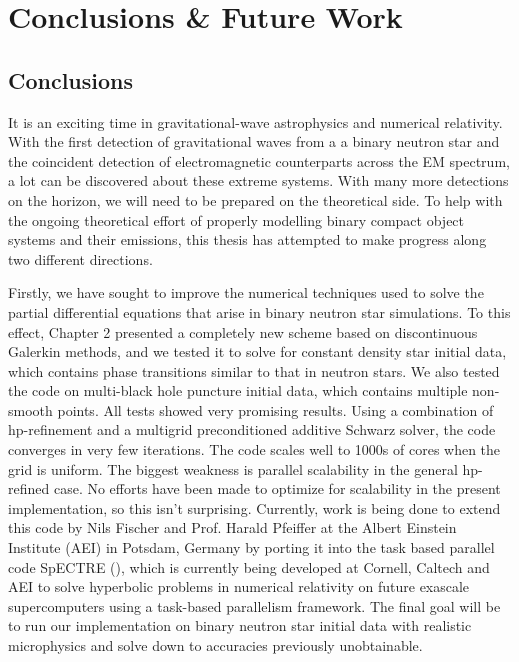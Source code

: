 \chapter{Conclusions \& Future Work}
\label{chap:conc}

\section{Conclusions}

It is an exciting time in gravitational-wave astrophysics and numerical relativity. With the first detection of gravitational waves from a a binary neutron star and the coincident detection of electromagnetic counterparts across the EM spectrum, a lot can be discovered about these extreme systems. With many more detections on the horizon, we will need to be prepared on the theoretical side. To help with the ongoing theoretical effort of properly modelling binary compact object systems and their emissions, this thesis has attempted to make progress along two different directions.

Firstly, we have sought to improve the numerical techniques used to solve the partial differential equations that arise in binary neutron star simulations. To this effect, Chapter 2 presented a completely new scheme based on discontinuous Galerkin methods, and we tested it to solve for constant density star initial data, which contains phase transitions similar to that in neutron stars. We also tested the code on multi-black hole puncture initial data, which contains multiple non-smooth points. All tests showed very promising results. Using a combination of hp-refinement and a multigrid preconditioned additive Schwarz solver, the code converges in very few iterations. The code scales well to 1000s of cores when the grid is uniform. The biggest weakness is parallel scalability in the general hp-refined case. No efforts have been made to optimize for scalability in the present implementation, so this isn't surprising. Currently, work is being done to extend this code by Nils Fischer and Prof. Harald Pfeiffer at the Albert Einstein Institute (AEI) in Potsdam, Germany by porting it into the task based parallel code SpECTRE (\citet*{kidder2016spectre}), which is currently being developed at Cornell, Caltech and AEI to solve hyperbolic problems in numerical relativity on future exascale supercomputers using a task-based parallelism framework. The final goal will be to run our implementation on binary neutron star initial data with realistic microphysics and solve down to accuracies previously unobtainable.

